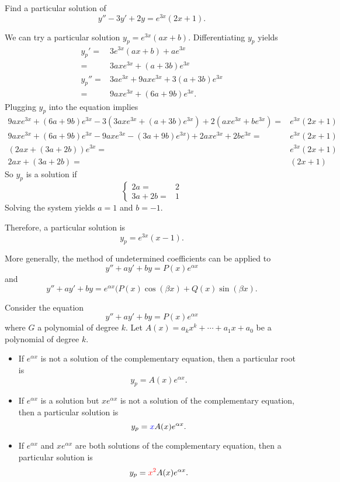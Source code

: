 \begin{exercise}
Find a particular solution of
\[y''-3y'+2y=e^{3x}(2x+1).\]
\end{exercise}
\begin{exersol}
We can try a particular solution $y_p=e^{3x}(ax+b)$.
Differentiating $y_p$ yields
\[
\begin{aligned}
  y_p'=&3e^{3x}(ax+b)+ae^{3x}\\
  =& 3axe^{3x}+(a+3b)e^{3x}\\[0.5em]
  y_p''=&3ae^{3x}+9axe^{3x}+3(a+3b)e^{3x}\\
  =&9axe^{3x}+(6a+9b)e^{3x}.
\end{aligned}  
\]
Plugging $y_p$ into the equation implies
\[
\begin{aligned}
  9axe^{3x}+(6a+9b)e^{3x}-3(3axe^{3x}+(a+3b)e^{3x})+2(axe^{3x}+be^{3x})=&e^{3x}(2x+1)\\
  9axe^{3x}+(6a+9b)e^{3x}-9axe^{3x}-(3a+9b)e^{3x})+2axe^{3x}+2be^{3x}=&e^{3x}(2x+1)\\
  (2ax+(3a+2b))e^{3x}=&e^{3x}(2x+1)\\
  2ax+(3a+2b)=&(2x+1)
\end{aligned}  
\]
So $y_p$ is a solution if 
\[
  \begin{cases}
    2a=&2\\
  3a+2b=&1
\end{cases}
\]
Solving the system yields $a=1$ and $b=-1$.

Therefore, a particular solution is
\[y_p=e^{3x}(x-1).\]
\end{exersol}

More generally, the method of undetermined coefficients can be applied to
\[y''+ay'+by=P(x)e^{\alpha x}\]
and
\[y''+ay'+by=e^{\alpha x}(P(x)\cos(\beta x)+Q(x)\sin(\beta x).\]

\begin{theorem}
  Consider the equation 
  \[y''+ay'+by=P(x)e^{\alpha x}\]
  where $G$ a polynomial of degree $k$. Let $A(x)=a_kx^k+\cdots+a_1x+a_0$ be a polynomial of degree $k$.
  \begin{itemize}
    \item If $e^{\alpha x}$ is not a solution of the complementary equation, then a particular root is \[y_p=A(x)e^{\alpha x}.\]
    \item If $e^{\alpha x}$ is a solution but $xe^{\alpha x}$ is not a solution of the complementary equation, then a particular solution is \[y_p={\color{blue}x}A(x)e^{\alpha x}.\]
    \item If $e^{\alpha x}$ and $xe^{\alpha x}$ are both solutions of the complementary equation, then a particular solution is \[y_p={\color{red}x^2}A(x)e^{\alpha x}.\]
  \end{itemize}
\end{theorem}

